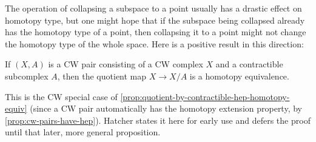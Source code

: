 The operation of collapsing a subspace to a point usually has a drastic effect on
homotopy type, but one might hope that if the subspace being collapsed already has
the homotopy type of a point, then collapsing it to a point might not change the
homotopy type of the whole space. Here is a positive result in this direction:

\begin{proposition}
\label{prop:collapsing-contractible-cw-subcomplex}
If $(X,A)$ is a CW pair consisting of a CW complex $X$ and a contractible
subcomplex $A$, then the quotient map $X \to X/A$ is a homotopy equivalence.
\end{proposition}

\begin{remark}
\label{rem:collapsing-contractible-cw-subcomplex-special-case}
This is the CW special case of \cref{prop:quotient-by-contractible-hep-homotopy-equiv}
(since a CW pair automatically has the homotopy extension property, by
\cref{prop:cw-pairs-have-hep}). Hatcher states it here for early use and defers the
proof until that later, more general proposition.
\end{remark}


